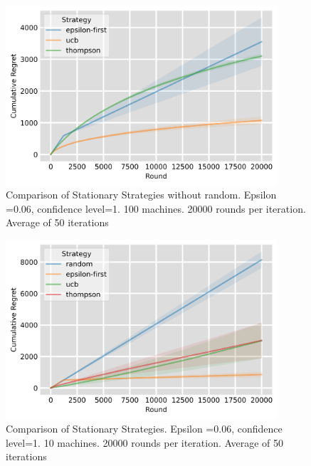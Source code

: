 \begin{figure}
    \centering
    \includegraphics[width=0.9\textwidth]{figures/plot1.png}
    \caption[Comparison of Stationary Strategies without random]{Comparison of Stationary Strategies without random. Epsilon =0.06, confidence level=1. 100 machines. 20000 rounds per iteration. Average of 50 iterations}
    \label{fig: all2}
\end{figure}

\begin{figure}
    \centering
    \includegraphics[width=0.9\textwidth]{figures/plot10.png}
    \caption[Comparison for 10 machines]{Comparison of Stationary Strategies. Epsilon =0.06, confidence level=1. 10 machines. 20000 rounds per iteration. Average of 50 iterations}
    \label{fig: all3}
\end{figure}

